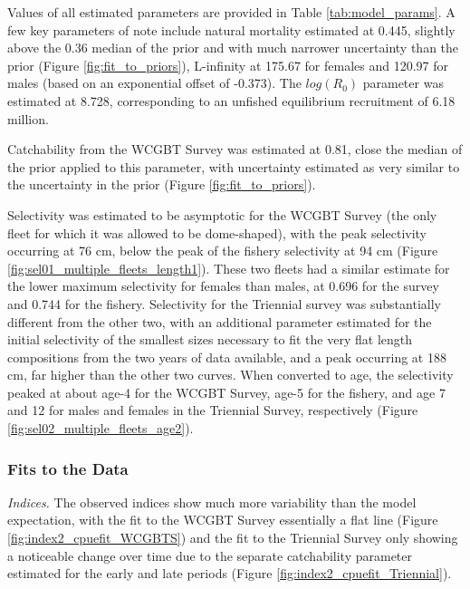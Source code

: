 \documentclass[12pt,]{article}
\begin{document}
Values of all estimated parameters are provided in Table
\ref{tab:model_params}. A few key parameters of note include natural
mortality estimated at 0.445, slightly above the 0.36 median of the
prior and with much narrower uncertainty than the prior (Figure
\ref{fig:fit_to_priors}), L-infinity at 175.67 for females and 120.97
for males (based on an exponential offset of -0.373). The \(log(R_0)\)
parameter was estimated at 8.728, corresponding to an unfished
equilibrium recruitment of 6.18 million.

Catchability from the WCGBT Survey was estimated at 0.81, close the
median of the prior applied to this parameter, with uncertainty
estimated as very similar to the uncertainty in the prior (Figure
\ref{fig:fit_to_priors}).

Selectivity was estimated to be asymptotic for the WCGBT Survey (the
only fleet for which it was allowed to be dome-shaped), with the peak
selectivity occurring at 76 cm, below the peak of the fishery
selectivity at 94 cm (Figure \ref{fig:sel01_multiple_fleets_length1}).
These two fleets had a similar estimate for the lower maximum
selectivity for females than males, at 0.696 for the survey and 0.744
for the fishery. Selectivity for the Triennial survey was substantially
different from the other two, with an additional parameter estimated for
the initial selectivity of the smallest sizes necessary to fit the very
flat length compositions from the two years of data available, and a
peak occurring at 188 cm, far higher than the other two curves. When
converted to age, the selectivity peaked at about age-4 for the WCGBT
Survey, age-5 for the fishery, and age 7 and 12 for males and females in
the Triennial Survey, respectively (Figure
\ref{fig:sel02_multiple_fleets_age2}).

\hypertarget{fits-to-the-data}{%
\subsubsection{Fits to the Data}\label{fits-to-the-data}}

\emph{Indices.} The observed indices show much more variability than the
model expectation, with the fit to the WCGBT Survey essentially a flat
line (Figure \ref{fig:index2_cpuefit_WCGBTS}) and the fit to the
Triennial Survey only showing a noticeable change over time due to the
separate catchability parameter estimated for the early and late periods
(Figure \ref{fig:index2_cpuefit_Triennial}).
\end{document}
